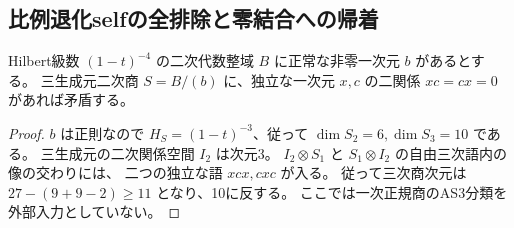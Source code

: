 \subsection{比例退化selfの全排除と零結合への帰着}
\label{subsec:cubic-third-root-nonunit-degenerate-self}
\begin{lemma}[正常一次商の逆向き零積障害]
\label{lem:cubic-normal-linear-opposite-products}
Hilbert級数 $(1-t)^{-4}$ の二次代数整域 $B$ に正常な非零一次元 $b$ があるとする。
三生成元二次商 $S=B/(b)$ に、独立な一次元 $x,c$ の二関係 $xc=cx=0$ があれば矛盾する。
\end{lemma}
\begin{proof}
$b$ は正則なので $H_S=(1-t)^{-3}$、従って $\dim S_2=6,\dim S_3=10$ である。
三生成元の二次関係空間 $I_2$ は次元3。
$I_2\otimes S_1$ と $S_1\otimes I_2$ の自由三次語内の像の交わりには、
二つの独立な語 $xcx,cxc$ が入る。
従って三次商次元は $27-(9+9-2)\ge11$ となり、10に反する。
ここでは一次正規商のAS3分類を外部入力としていない。
\end{proof}


